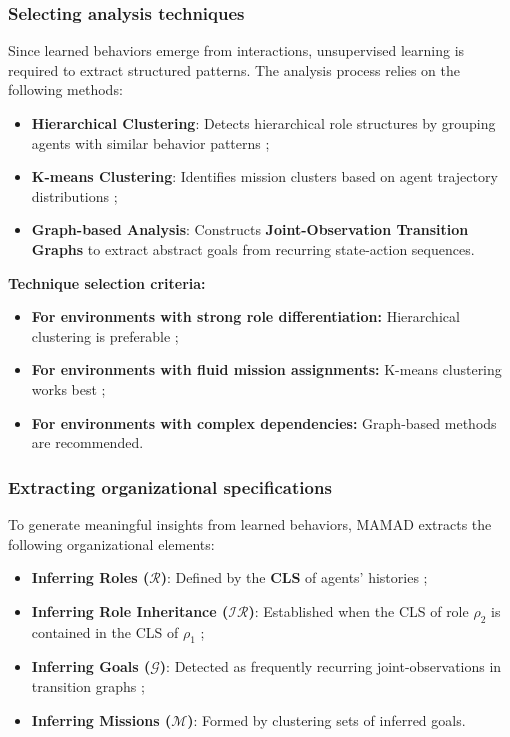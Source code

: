 \documentclass[pdflatex,sn-mathphys-num]{sn-jnl}%
\theoremstyle{thmstyleone}%
\theoremstyle{thmstyletwo}%
\theoremstyle{thmstylethree}%
\begin{document}
\subsubsection{Selecting analysis techniques}
Since learned behaviors emerge from interactions, unsupervised learning is required to extract structured patterns. The analysis process relies on the following methods:

\begin{itemize}
    \item \textbf{Hierarchical Clustering}: Detects hierarchical role structures by grouping agents with similar behavior patterns ;
    \item \textbf{K-means Clustering}: Identifies mission clusters based on agent trajectory distributions ;
    \item \textbf{Graph-based Analysis}: Constructs \textbf{Joint-Observation Transition Graphs} to extract abstract goals from recurring state-action sequences.
\end{itemize}

\noindent \textbf{Technique selection criteria:}
\begin{itemize}
    \item \textbf{For environments with strong role differentiation:} Hierarchical clustering is preferable ;
    \item \textbf{For environments with fluid mission assignments:} K-means clustering works best ;
    \item \textbf{For environments with complex dependencies:} Graph-based methods are recommended.
\end{itemize}

\subsubsection{Extracting organizational specifications}
To generate meaningful insights from learned behaviors, MAMAD extracts the following organizational elements:

\begin{itemize}
    \item \textbf{Inferring Roles ($\mathcal{R}$)}: Defined by the \textbf{CLS} of agents' histories ;
    \item \textbf{Inferring Role Inheritance ($\mathcal{IR}$)}: Established when the CLS of role $\rho_2$ is contained in the CLS of $\rho_1$ ;
    \item \textbf{Inferring Goals ($\mathcal{G}$)}: Detected as frequently recurring joint-observations in transition graphs ;
    \item \textbf{Inferring Missions ($\mathcal{M}$)}: Formed by clustering sets of inferred goals.
\end{itemize}
\end{document}
